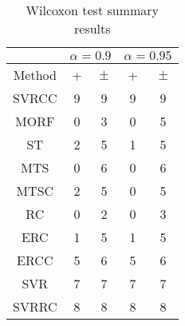 \documentclass[a4paper,10pt]{article}
\begin{document}
\begin{table}[!htp]
\centering\scriptsize
\begin{tabular}{
|c|c|c|c|c|}
\hline
&\multicolumn{2}{c|}{$\alpha=0.9$} & \multicolumn{2}{c|}{$\alpha=0.95$}\\\hline
Method & + & $\pm$ & + & $\pm$ \\
\hline
SVRCC & 9 & 9 & 9 & 9\\
\hline
MORF & 0 & 3 & 0 & 5\\
\hline
ST & 2 & 5 & 1 & 5\\
\hline
MTS & 0 & 6 & 0 & 6\\
\hline
MTSC & 2 & 5 & 0 & 5\\
\hline
RC & 0 & 2 & 0 & 3\\
\hline
ERC & 1 & 5 & 1 & 5\\
\hline
ERCC & 5 & 6 & 5 & 6\\
\hline
SVR & 7 & 7 & 7 & 7\\
\hline
SVRRC & 8 & 8 & 8 & 8\\
\hline

\end{tabular}
\caption{Wilcoxon test summary results}

\end{table}

 \clearpage 
\end{document}
